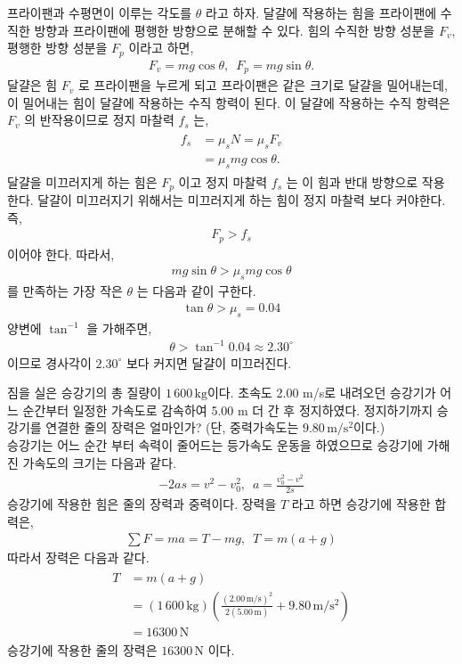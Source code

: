 \documentclass[floatfix,nofootinbib,superscriptaddress,fleqn,preprint]{revtex4}
\begin{document}
프라이팬과 수평면이 이루는 각도를 $\theta$ 라고 하자. 달걀에 작용하는 힘을
프라이팬에 수직한 방향과 프라이팬에 평행한 방향으로 분해할 수 있다. 힘의 수직한
방향 성분을 $F_v$, 평행한 방향 성분을 $F_p$ 이라고 하면,
\begin{align}
F_v = mg\cos{\theta},\,\,\,F_p = mg\sin{\theta}  .
\end{align} 
달걀은 힘 $F_v$ 로 프라이팬을 누르게 되고 프라이팬은 같은 크기로 달걀을 밀어내는데,
이 밀어내는 힘이 달걀에 작용하는 수직 항력이 된다.
이 달걀에 작용하는 수직 항력은 $F_v$ 의 반작용이므로 정지 마찰력 $f_s$ 는,
\begin{align}
  \begin{split}
    f_s &= \mu_s N = \mu_s F_v \\
    &= \mu_s mg\cos{\theta}.
  \end{split}
\end{align} 
달걀을 미끄러지게 하는 힘은 $F_p$ 이고 정지 마찰력 $f_s$ 는 이 힘과 반대 방향으로
작용한다. 달걀이 미끄러지기 위해서는 미끄러지게 하는 힘이 정지 마찰력 보다 커야한다. 즉,
\begin{align}
  F_p > f_s
\end{align}
이어야 한다. 따라서,
\begin{align}
  mg\sin{\theta}  > \mu_s mg\cos{\theta}
\end{align}
를 만족하는 가장 작은 $\theta$ 는 다음과 같이 구한다.
\begin{align}
  \tan{\theta} > \mu_s = 0.04
\end{align}
양변에 $\tan^{-1}$ 을 가해주면,
  \begin{align}
  \theta > \tan^{-1}{0.04} \approx 2.30^\circ
\end{align}
이므로 경사각이 $2.30^\circ$ 보다 커지면 달걀이 미끄러진다.
\vspace{2cm}

짐을 실은 승강기의 총 질량이 
$1\,600\,\mathrm{kg}$이다. 초속도 2.00 m/s로 내려오던 승강기가 어느
순간부터 일정한 가속도로 감속하여 5.00 m 더 간 후
정지하였다. 정지하기까지 승강기를 연결한 줄의 장력은 얼마인가? (단,
중력가속도는 $9.80\,\mathrm{m/s^2}$이다.)   \\

승강기는 어느 순간 부터 속력이 줄어드는 등가속도 운동을 하였으므로
 승강기에 가해진 가속도의 크기는 다음과 같다.
\begin{align}
  -2as = v^2-v_0^2,\,\,\, a = \frac{v_0^2-v^2}{2s}
\end{align}
승강기에 작용한 힘은 줄의 장력과 중력이다. 장력을 $T$ 라고 하면
 승강기에 작용한 합력은,
\begin{align}
  \sum F = ma = T-mg,\,\,\, T = m(a+g)
\end{align}
따라서 장력은 다음과 같다.
\begin{align}
  \begin{split}
    T  &= m(a+g)  \\ 
    &= (1\,600\,\mathrm{kg})\left(\frac{(2.00\,\mathrm{m/s})^2}
    {2(5.00\,\mathrm{m})}+9.80\,\mathrm{m/s^2}\right) \\
    &=16300\,\mathrm{N}
  \end{split}
\end{align}
승강기에 작용한 줄의 장력은 $16300\,\mathrm{N}$ 이다.
\end{document}
